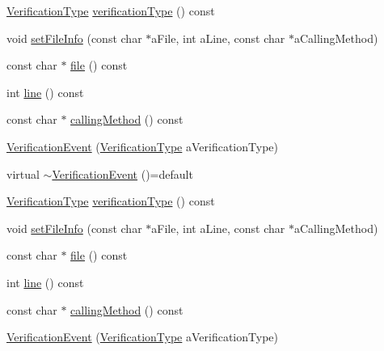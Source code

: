\begin{DoxyCompactItemize}
\item 
\mbox{\hyperlink{namespacefakeit_a9df22520dd60badb149c1d1d2518b253}{Verification\+Type}} \mbox{\hyperlink{structfakeit_1_1VerificationEvent_a8b06372b0691ff1f6f2c4f59f5b05922}{verification\+Type}} () const
\item 
void \mbox{\hyperlink{structfakeit_1_1VerificationEvent_a6199b34d65e06976395f606f0c92f361}{set\+File\+Info}} (const char $\ast$a\+File, int a\+Line, const char $\ast$a\+Calling\+Method)
\item 
const char $\ast$ \mbox{\hyperlink{structfakeit_1_1VerificationEvent_ac5e560840147ea9e20e7e802470f4d8a}{file}} () const
\item 
int \mbox{\hyperlink{structfakeit_1_1VerificationEvent_a3069b93e69102a34fca21178e931e789}{line}} () const
\item 
const char $\ast$ \mbox{\hyperlink{structfakeit_1_1VerificationEvent_a13a854b648de4ed0a11d9f1bd3d22da5}{calling\+Method}} () const
\item 
\mbox{\hyperlink{structfakeit_1_1VerificationEvent_afc2366f1ae4d03ec60cc2a2253a79728}{Verification\+Event}} (\mbox{\hyperlink{namespacefakeit_a9df22520dd60badb149c1d1d2518b253}{Verification\+Type}} a\+Verification\+Type)
\item 
virtual \mbox{\hyperlink{structfakeit_1_1VerificationEvent_a5bcca5502a6be4d65db30c1927652a77}{$\sim$\+Verification\+Event}} ()=default
\item 
\mbox{\hyperlink{namespacefakeit_a9df22520dd60badb149c1d1d2518b253}{Verification\+Type}} \mbox{\hyperlink{structfakeit_1_1VerificationEvent_a8b06372b0691ff1f6f2c4f59f5b05922}{verification\+Type}} () const
\item 
void \mbox{\hyperlink{structfakeit_1_1VerificationEvent_a6199b34d65e06976395f606f0c92f361}{set\+File\+Info}} (const char $\ast$a\+File, int a\+Line, const char $\ast$a\+Calling\+Method)
\item 
const char $\ast$ \mbox{\hyperlink{structfakeit_1_1VerificationEvent_ac5e560840147ea9e20e7e802470f4d8a}{file}} () const
\item 
int \mbox{\hyperlink{structfakeit_1_1VerificationEvent_a3069b93e69102a34fca21178e931e789}{line}} () const
\item 
const char $\ast$ \mbox{\hyperlink{structfakeit_1_1VerificationEvent_a13a854b648de4ed0a11d9f1bd3d22da5}{calling\+Method}} () const
\item 
\mbox{\hyperlink{structfakeit_1_1VerificationEvent_afc2366f1ae4d03ec60cc2a2253a79728}{Verification\+Event}} (\mbox{\hyperlink{namespacefakeit_a9df22520dd60badb149c1d1d2518b253}{Verification\+Type}} a\+Verification\+Type)

\end{DoxyCompactItemize}
